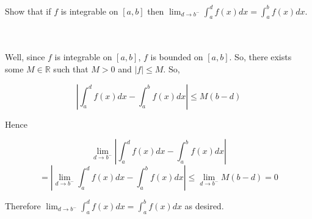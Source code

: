 Show that if $f$ is integrable on $[a,b]$ then 
$\lim_{d\rightarrow b^-}\int_a^df(x)dx=\int_a^bf(x)dx$.\\\\

\begin{solution}\renewcommand{\qedsymbol}{}\ \\
    Well, since $f$ is integrable on $[a,b]$, $f$ is bounded on $[a,b]$. So, there exists some
    $M\in\mathbb{R}$ such that $M>0$ and $|f|\leq M$. So,
    
    $$|\int_a^df(x)dx-\int_a^bf(x)dx|\leq M(b-d)$$
    
    Hence
    
    $$\lim_{d\rightarrow b^-}|\int_a^df(x)dx-\int_a^bf(x)dx|$$
    $$=|\lim_{d\rightarrow b^-}\int_a^df(x)dx-\int_a^bf(x)dx|\leq \lim_{d\rightarrow b^-}M(b-d)=0$$
    
    Therefore $\lim_{d\rightarrow b^-}\int_a^df(x)dx=\int_a^bf(x)dx$ as desired.

\end{solution}